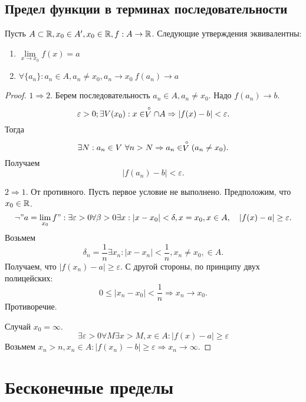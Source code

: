 \documentclass[12pt]{report}
\begin{document}
\subsection{Предел функции в терминах последовательности}\label{ques_36}
\begin{thm}
Пусть $A \subset \mathbb{R}, x_0 \in A', x_0 \in \mathbb{R}, f: A \to \mathbb{R}$. Следующие утверждения эквивалентны:
\begin{enumerate}
\item $\lim\limits_{x \to x_0}{f(x)} = a$
\item $\forall \{a_n\}: a_n \in A, a_n \neq x_0, a_n \to x_0  ~f(a_n) \to a$
\end{enumerate}
\end{thm}
\begin{proof}
    $1 \Rightarrow 2$. 
    Берем последовательность $a_n \in  A, a_n \ne x_0$.
    Надо $f(a_n) \to  b$.
    \[
	\varepsilon >0; \exists  V(x_0): x \in  \stackrel \circ V \cap A \Rightarrow |f(x) - b| < \varepsilon 
    .\] 
    Тогда \[
	\exists N: a_n \in V ~ \forall n > N \Rightarrow a_n \in  \stackrel \circ V (a_n \ne x_0)
    .\] 
    Получаем \[
	|f(a_n) - b| < \varepsilon 
    .\] 

    $2 \Rightarrow 1$.
    От противного. Пусть первое условие не выполнено. Предположим, что $x_0 \in  \mathbb{R}$. \[
	\neg "a = \lim_{x_0} f": \exists \varepsilon >0 \forall \beta >0 \exists x: |x-x_0|<\delta  , x= x_0, x \in A, \quad |f(x) - a| \ge \varepsilon 
    .\] 
   Возьмем \[
     \delta  _n = \frac{1}{n} \exists x_n : |x - x_n| < \frac{1}{n}, x_n \ne x_0, \in A 
    .\] 
    Получаем, что $|f(x_n) - a| \ge  \varepsilon $. С другой стороны, по принципу двух полицейских:
    \[
	0 \le |x_n -x_0| < \frac{1}{n} \Longrightarrow x_n \to  x_0
    .\] 
    Противоречие.

    Случай $x_0 = \infty$.
    $$\exists \varepsilon >0 \forall  M \exists x > M , x \in  A: |f(x) -a| \ge  \varepsilon $$
    Возьмем $x_n > n , x_n \in A: |f(x_n) - b| \ge \varepsilon \Rightarrow x_n \to  \infty$.
\end{proof}

\section{Бесконечные пределы}
\end{document}

